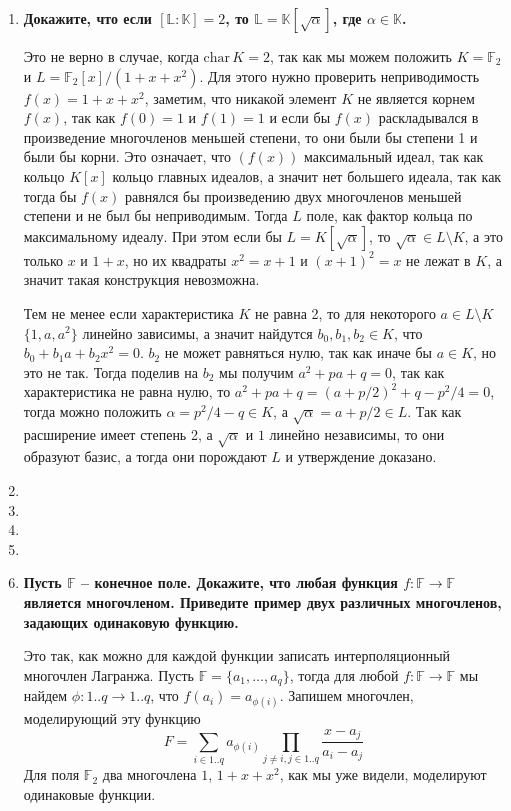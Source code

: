 \documentclass{article}
\begin{document}
\begin{enumerate}
    \item \textbf{Докажите, что если $[\mathbb{L}:\mathbb{K}]=2$, то $\mathbb{L}=\mathbb{K}[\sqrt \alpha]$, где
        $\alpha\in\mathbb{K}$.} 

        Это не верно в случае, когда $\text{char}\,K=2$, так как мы можем положить
        $K=\mathbb{F}_2$ и $L=\mathbb{F}_2[x]/(1+x+x^2)$. Для этого нужно проверить
        неприводимость $f(x)=1+x+x^2$, заметим, что никакой элемент $K$ не является
        корнем $f(x)$, так как $f(0)=1$ и $f(1)=1$ и если бы $f(x)$ раскладывался
        в произведение многочленов меньшей степени, то они были бы степени 1 и были
        бы корни. Это означает, что $(f(x))$ максимальный идеал, так как кольцо $K[x]$
        кольцо главных идеалов, а значит нет большего идеала, так как тогда бы
        $f(x)$ равнялся бы произведению двух многочленов меньшей степени и не
        был бы неприводимым. Тогда $L$ поле, как фактор кольца по максимальному
        идеалу. При этом если бы $L=K[\sqrt \alpha]$, то $\sqrt \alpha\in L
        \setminus K$, а это только $x$ и $1+x$, но их квадраты $x^2=x+1$ и
        $(x+1)^2=x$ не лежат в $K$, а значит такая конструкция невозможна.

        Тем не менее если характеристика $K$ не равна 2, то для некоторого $a
        \in L\setminus K$ $\{1,a,a^2\}$ линейно зависимы, а значит найдутся $b_0,
        b_1,b_2\in K$, что $b_0+b_1a+b_2x^2=0$. $b_2$ не может равняться нулю,
        так как иначе бы $a\in K$, но это не так. Тогда поделив на $b_2$ мы
        получим $a^2+pa+q=0$, так как характеристика не равна нулю, то $a^2+pa+q
        =(a+p/2)^2+q-p^2/4=0$, тогда можно положить $\alpha=p^2/4-q\in K$, а $\sqrt
        \alpha=a+p/2\in L$. Так как расширение имеет степень 2, а $\sqrt\alpha$
        и $1$ линейно независимы, то они образуют базис, а тогда они порождают
        $L$ и утверждение доказано.

    \item
    \item
    \item
    \item
    \item \textbf{Пусть $\mathbb{F}$ – конечное поле. Докажите, что любая
        функция $f:\mathbb{F}\rightarrow\mathbb{F}$ является многочленом.
        Приведите пример двух различных многочленов, задающих одинаковую
        функцию.}

        Это так, как можно для каждой функции записать интерполяционный
        многочлен Лагранжа. Пусть $\mathbb{F}=\{a_1,\ldots,a_q\}$, тогда
        для любой $f:\mathbb{F}\rightarrow\mathbb{F}$ мы найдем $\phi:1..q
        \rightarrow1..q$, что $f(a_i)=a_{\phi(i)}$. Запишем многочлен,
        моделирующий эту функцию
        \[F=\sum_{i\in1..q}a_{\phi(i)}\prod_{j\neq i, j\in1..q}\frac{x-a_j}{a_i-a_j}\]
        Для поля $\mathbb{F}_2$ два многочлена $1$, $1+x+x^2$, как мы уже видели,
        моделируют одинаковые функции.


\end{enumerate}
\end{document}
